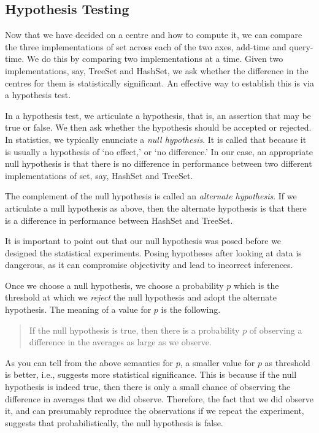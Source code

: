 \subsection{Hypothesis Testing}\label{sec:statistics:hypo}
Now that we have decided on a centre and how to compute it,
we can compare the three implementations of set across
each of the two axes, add-time and query-time.
We do this by comparing two implementations at a time.
Given two implementations, say, TreeSet and HashSet,
we ask whether the difference in the centres for them
is statistically significant. An effective way to establish
this is via a hypothesis test.

In a hypothesis test, we articulate a hypothesis, that is,
an assertion that may be true or false. We then ask whether
the hypothesis should be accepted or rejected. In statistics,
we typically enunciate a \emph{null hypothesis}.
It is called that because it is usually a hypothesis of
`no effect,' or `no difference.' In our case, an appropriate
null hypothesis is that there is no difference in performance
between two different implementations of set, say,
HashSet and TreeSet.

The complement of the null hypothesis is called an
\emph{alternate hypothesis}.
If we articulate a null hypothesis as above, then the alternate
hypothesis is that there is a difference in performance
between HashSet and TreeSet.

It is important to point out that our null hypothesis was posed
before we designed the statistical experiments. Posing hypotheses
after looking at data is dangerous, as it 
can compromise objectivity and lead to incorrect inferences.

Once we choose a null hypothesis,
we choose a probability $p$ which is the threshold at which
we \emph{reject} the null hypothesis and adopt the alternate
hypothesis. The meaning of a value for $p$ is the following.
\begin{quote}
    If the null hypothesis is true, then
    there is a probability $p$ of observing a difference
    in the averages as large as we observe.
\end{quote}

As you can tell from the above semantics for $p$, a smaller
value for $p$ as threshold is better, i.e., suggests more
statistical significance. This is because if the null hypothesis
is indeed true, then there is only a small chance of observing
the difference in averages that we did observe. Therefore,
the fact that we did observe it, and can presumably reproduce
the observations if we repeat the experiment, suggests that
probabilistically, the null hypothesis is false.

